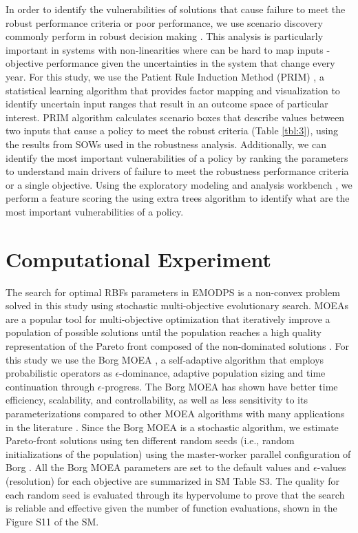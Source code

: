 \documentclass[a4paper,fleqn]{cas-sc}
\begin{document}
In order to identify the vulnerabilities of solutions that cause failure to meet the robust performance criteria or poor performance, we use scenario discovery commonly perform in robust decision making \citep{kasprzyk_many_2013,lempert_identifying_2010}. This analysis is particularly important in systems with non-linearities where can be hard to map inputs - objective performance given the uncertainties in the system that change every year. For this study, we use the Patient Rule Induction Method (PRIM) \citep{friedman_bump_1999,kwakkel_improving_2016}, a statistical learning algorithm that provides factor mapping and visualization to identify uncertain input ranges that result in an outcome space of particular interest. PRIM algorithm calculates scenario boxes that describe values between two inputs that cause a policy to meet the robust criteria (Table \ref{tbl:3}), using the results from SOWs used in the robustness analysis. Additionally, we can identify the most important vulnerabilities of a policy by ranking the parameters to understand main drivers of failure to meet the robustness performance criteria or a single objective. Using the exploratory modeling and analysis workbench \citep{kwakkel_exploratory_2017}, we perform a feature scoring the using extra trees algorithm \citep{geurts_extremely_2006} to identify what are the most important vulnerabilities of a policy. 

\section{Computational Experiment}

The search for optimal RBFs parameters in EMODPS is a non-convex problem \citep{giuliani_curses_2016} solved in this study using stochastic multi-objective evolutionary search. MOEAs are a popular tool for multi-objective optimization that iteratively improve a population of possible solutions  until the population reaches a high quality representation of the Pareto front composed of the non-dominated solutions \citep{coello_evolutionary_2007}.  For this study we use the Borg MOEA \citep{hadka_borg_2013}, a self-adaptive algorithm that employs probabilistic operators as $\epsilon$-dominance, adaptive population sizing and time continuation through $\epsilon$-progress. The Borg MOEA has shown have better time efficiency, scalability, and controllability, as well as less sensitivity to its parameterizations compared to other MOEA algorithms with many applications in the literature \citep{reed_evolutionary_2013,gupta_can_2020,zatarain_salazar_balancing_2017,seyedashraf_assisting_2023,al-jawad_reservoir_2017}. Since the Borg MOEA is a stochastic algorithm, we estimate Pareto-front solutions using ten different random seeds (i.e., random initializations of the population) using the master-worker parallel configuration of Borg \citep{hadka_large-scale_2015}. All the Borg MOEA parameters are set to the default values \citep{hadka_borg_2013} and $\epsilon$-values (resolution) for each objective are summarized in SM Table S3. The quality for each random seed is evaluated through its hypervolume \citep{hadka_diagnostic_2012} to prove that the search is reliable and effective given the number of function evaluations, shown in the Figure S11 of the SM.
\end{document}
